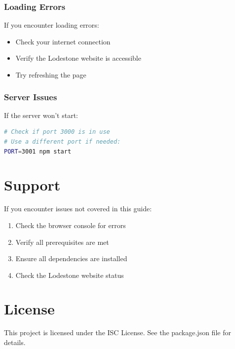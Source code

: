 \documentclass[12pt]{article}
\begin{document}
\subsubsection{Loading Errors}
If you encounter loading errors:
\begin{itemize}
    \item Check your internet connection
    \item Verify the Lodestone website is accessible
    \item Try refreshing the page
\end{itemize}

\subsubsection{Server Issues}
If the server won't start:
\begin{lstlisting}[language=bash]
# Check if port 3000 is in use
# Use a different port if needed:
PORT=3001 npm start
\end{lstlisting}

\section{Support}
If you encounter issues not covered in this guide:
\begin{enumerate}
    \item Check the browser console for errors
    \item Verify all prerequisites are met
    \item Ensure all dependencies are installed
    \item Check the Lodestone website status
\end{enumerate}

\section{License}
This project is licensed under the ISC License. See the package.json file for details.
\end{document}
